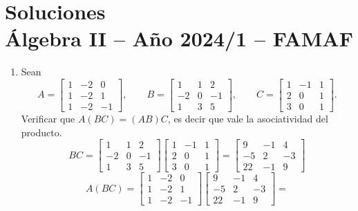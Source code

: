 
\chapter{Soluciones\\Álgebra  II -- Año 2024/1 -- FAMAF}\label{practico-3}

\begin{enumerate}[topsep=6pt,itemsep=.4cm]


\item\label{ej} Sean
$$
A= \begin{bmatrix} 1&-2&0\\ 1&-2&1\\ 1&-2&-1\end{bmatrix},\quad
\quad B= \begin{bmatrix}1&1&2\\ -2&0&-1\\ 1&3&5 \end{bmatrix},
\quad\quad C=\begin{bmatrix}1&-1&1\\ 2&0&1\\ 3&0&1 \end{bmatrix}.
$$
Verificar que $A(BC)=(AB)C$, es decir que vale la asociatividad del producto.
\rta
\begin{equation*}
    BC =  \begin{bmatrix}1&1&2\\ -2&0&-1\\ 1&3&5 \end{bmatrix} \begin{bmatrix}1&-1&1\\ 2&0&1\\ 3&0&1 \end{bmatrix}=\begin{bmatrix}9 & -1 & 4 \\-5 & 2 & -3 \\22 & -1 & 9 \end{bmatrix}
\end{equation*}
\begin{equation*}
    A(BC) =\begin{bmatrix} 1&-2&0\\ 1&-2&1\\ 1&-2&-1\end{bmatrix}\begin{bmatrix}9 & -1 & 4 \\-5 & 2 & -3 \\22 & -1 & 9 \end{bmatrix} =

\end{equation*}
\end{enumerate}
